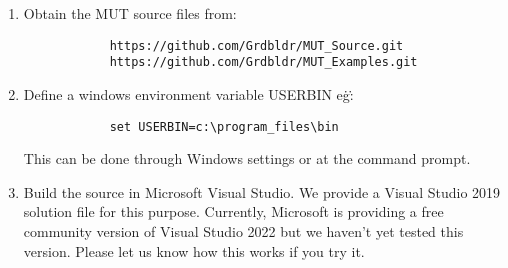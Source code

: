 \begin{enumerate}
    \item Obtain the MUT source files from:
        \begin{verbatim}
            https://github.com/Grdbldr/MUT_Source.git
            https://github.com/Grdbldr/MUT_Examples.git
        \end{verbatim}

    \item Define a windows environment variable USERBIN e\.g\.:
        \begin{verbatim}
            set USERBIN=c:\program_files\bin
        \end{verbatim}
        This can be done through Windows settings or at the command prompt.

    \item Build the source in Microsoft Visual Studio.  We provide a Visual Studio 2019 solution file for this purpose. Currently, Microsoft is providing a free community version of Visual Studio 2022 but we haven't yet tested this version.  Please let us know how this works if you try it.

\end{enumerate}   